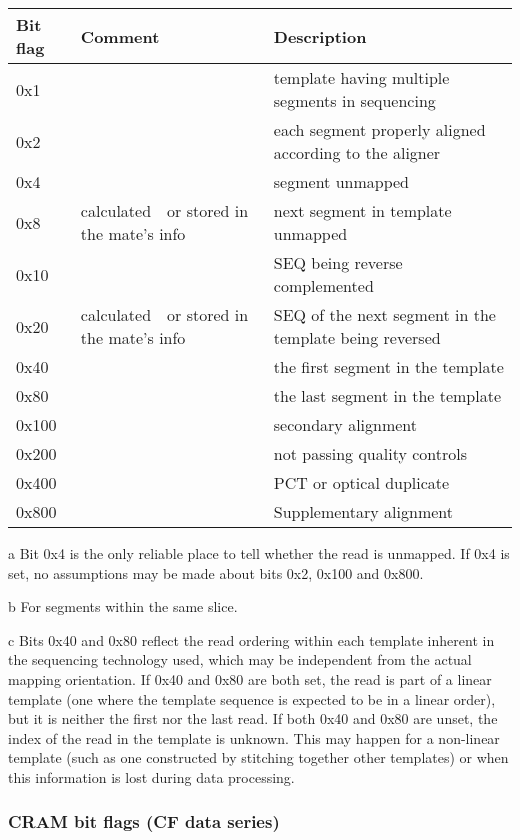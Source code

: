 \documentclass[a4paper]{article}
\begin{document}
\begin{threeparttable}[t]
\begin{tabular}{|>{\raggedright}p{144pt}|>{\raggedright}p{144pt}|>{\raggedright}p{144pt}|}
\hline
\textbf{Bit flag} & \textbf{Comment} & \textbf{Description}\tabularnewline
\hline
0x1 &  & template having multiple segments in sequencing\tabularnewline
\hline
0x2 &  & each segment properly aligned according to the aligner\tabularnewline
\hline
0x4 &  & segment unmapped\tnote{a}\tabularnewline
\hline
0x8 & calculated\tnote{b}\ \ or stored in the mate's info & next segment in template unmapped\tabularnewline
\hline
0x10 &  & SEQ being reverse complemented\tabularnewline
\hline
0x20 & calculated\tnote{b}\ \ or stored in the mate's info & SEQ of the next segment in the
template being reversed\tabularnewline
\hline
0x40 &  & the first segment in the template\tnote{c}\tabularnewline
\hline
0x80 &  & the last segment in the template\tnote{c}\tabularnewline
\hline
0x100 &  & secondary alignment\tabularnewline
\hline
0x200 &  & not passing quality controls\tabularnewline
\hline
0x400 &  & PCT or optical duplicate\tabularnewline
\hline
0x800 &  & Supplementary alignment\tabularnewline
\hline
\end{tabular}
\begin{tablenotes}
\item[a] Bit 0x4 is the only reliable place to tell whether the read is unmapped.  If 0x4 is set, no assumptions may be made about bits 0x2, 0x100 and 0x800.
\item[b] For segments within the same slice.
\item[c] Bits 0x40 and 0x80 reflect the read ordering within each template inherent in the sequencing technology used, which may be independent from the actual mapping orientation.
If 0x40 and 0x80 are both set, the read is part of a linear template (one where the template sequence is expected to be in a linear order), but it is neither the first nor the last read.
If both 0x40 and 0x80 are unset, the index of the read in the template is unknown.
This may happen for a non-linear template (such as one constructed by stitching together other templates) or when this information is lost during data processing.
\end{tablenotes}
\end{threeparttable}

\subsubsection*{\textbf{CRAM bit flags (CF data series)}}
\end{document}
